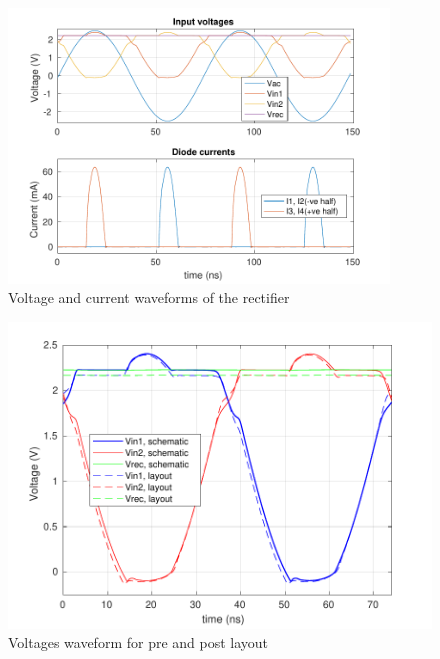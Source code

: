 \documentclass[12pt,a4paper,UKenglish]{report}
\begin{document}
\begin{figure}[H] %
   \centering
   \includegraphics[width=0.9\textwidth]{img/rectifier_VI.pdf} 
   \caption{Voltage and current waveforms of the rectifier}
   \label{rect_plot}
\end{figure}

\begin{figure}[H] %
   \centering
   \includegraphics[width=.9\textwidth]{img/rectifier_V_post.pdf} 
   \caption{Voltages waveform for pre and post layout}
   \label{fig:rect_v_post}
\end{figure}
\end{document}
